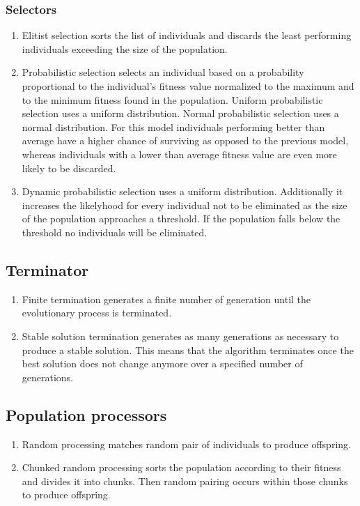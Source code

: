 \documentclass[a4paper,10pt]{article}
\begin{document}
\subsubsection{Selectors}
\begin{enumerate}
 \item Elitist selection sorts the list of individuals and discards the least performing individuals exceeding the size of the population.
 \item Probabilistic selection selects an individual based on a probability proportional to the individual's fitness value normalized to the maximum and to the minimum fitness found in the population.
    \subitem Uniform probabilistic selection uses a uniform distribution.
    \subitem Normal probabilistic selection uses a normal distribution. For this model individuals performing better than average have a higher chance of surviving as opposed to the previous model, whereas individuals with a lower than average fitness value are even more likely to be discarded.
  \item Dynamic probabilistic selection uses a uniform distribution. Additionally it increases the likelyhood for every individual not to be eliminated as the size of the population approaches a threshold. If the population falls below the threshold no individuals will be eliminated.
\end{enumerate}

\subsection{Terminator}
\begin{enumerate}
 \item Finite termination generates a finite number of generation until the evolutionary process is terminated.
 \item Stable solution termination generates as many generations as necessary to produce a stable solution. This means that the algorithm terminates once the best solution does not change anymore over a specified number of generations.
\end{enumerate}

\subsection{Population processors}
\begin{enumerate}
 \item Random processing matches random pair of individuals to produce offspring.
 \item Chunked random processing sorts the population according to their fitness and divides it into chunks. Then random pairing occurs within those chunks to produce offspring.
\end{enumerate}
\end{document}
